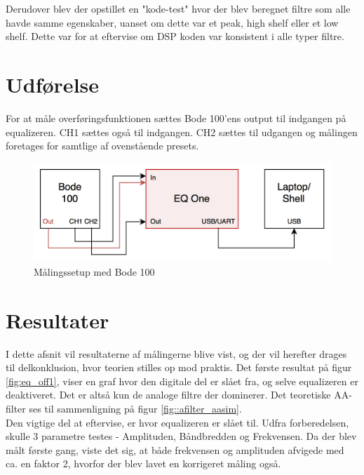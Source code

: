 Derudover blev der opstillet en "kode-test" hvor der blev beregnet filtre som alle havde samme egenskaber, uanset om dette var et peak, high shelf eller et low shelf. Dette var for at eftervise om DSP koden var konsistent i alle typer filtre. \\

\section{Udførelse}
For at måle overføringsfunktionen sættes Bode 100'ens output til indgangen på equalizeren. CH1 sættes også til indgangen. CH2 sættes til udgangen og målingen foretages for samtlige af ovenstående presets. \\


\begin{figure}[h!]\label{fig:bode_setup}
	\centering
	\includegraphics[width=13cm]{billeder/bode_setup}
	\caption{Målingssetup med Bode 100}
\end{figure}	

\FloatBlock

\section{Resultater}
I dette afsnit vil resultaterne af målingerne blive vist, og der vil herefter drages til delkonklusion, hvor teorien stilles op mod praktis.
Det første resultat på figur \ref{fig:eq_off1}, viser en graf hvor den digitale del er slået fra, og selve equalizeren er deaktiveret. Det er altså kun de analoge filtre der dominerer. Det teoretiske AA-filter ses til sammenligning på figur \ref{fig::afilter_aasim}. \\
Den vigtige del at eftervise, er hvor equalizeren er slået til. 
Udfra forberedelsen, skulle 3 parametre testes - Amplituden, Båndbredden og Frekvensen. 
Da der blev målt første gang, viste det sig, at både frekvensen og amplituden afvigede med ca. en faktor 2, hvorfor der blev lavet en korrigeret måling også.




